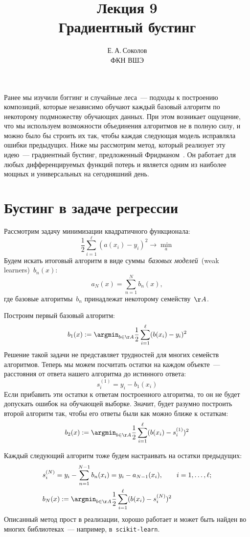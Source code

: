 \documentclass[12pt,fleqn]{article}
\begin{document}
\title{Лекция 9\\Градиентный бустинг}
\author{Е.\,А.\,Соколов\\ФКН ВШЭ}
\maketitle

Ранее мы изучили бэггинг и случайные леса~--- подходы к построению композиций, которые
независимо обучают каждый базовый алгоритм по некоторому подмножеству обучающих данных.
При этом возникает ощущение, что мы используем возможности объединения алгоритмов
не в полную силу, и можно было бы строить их так, чтобы каждая следующая модель
исправляла ошибки предыдущих.
Ниже мы рассмотрим метод, который реализует эту идею~--- градиентный бустинг,
предложенный Фридманом~\cite{friedman01gbm}.
Он работает для любых дифференцируемых функций потерь и является одним из наиболее
мощных и универсальных на сегодняшний день.

\section{Бустинг в задаче регрессии}\label{section:regBoost}
Рассмотрим задачу минимизации квадратичного функционала:
\[
    \frac12
    \sum_{i = 1}^{\ell}
        (a(x_i) - y_i)^2
    \to
    \min_{a}
\]
Будем искать итоговый алгоритм в виде суммы~\emph{базовых моделей}~(weak learners)~$b_n(x)$:
\[
    a_N(x)
    =
    \sum_{n = 1}^{N}
        b_n(x),
\]
где базовые алгоритмы~$b_n$ принадлежат некоторому семейству~$\AA$.

Построим первый базовый алгоритм:
\[
    b_1(x)
    :=
    \argmin_{b \in \AA}
        \frac12
        \sum_{i = 1}^{\ell}
            (b(x_i) - y_i)^2
\]
Решение такой задачи не представляет трудностей для многих семейств алгоритмов.
Теперь мы можем посчитать остатки на каждом объекте~--- расстояния от ответа
нашего алгоритма до истинного ответа:
\[
    s_i^{(1)} = y_i - b_1(x_i)
\]
Если прибавить эти остатки к ответам построенного алгоритма, то он не будет допускать
ошибок на обучающей выборке.
Значит, будет разумно построить второй алгоритм так, чтобы его ответы
были как можно ближе к остаткам:
\[
    b_2(x)
    :=
    \argmin_{b \in \AA}
        \frac12
        \sum_{i = 1}^{\ell}
            (b(x_i) - s_i^{(1)})^2
\]

Каждый следующий алгоритм тоже будем настраивать на остатки предыдущих:
\begin{align*}
    &s_i^{(N)}
    =
    y_i - \sum_{n = 1}^{N - 1} b_n(x_i)
    =
    y_i
    -
    a_{N - 1}(x_i),
    \qquad
    i = 1, \dots, \ell;\\
    &b_N(x)
    :=
    \argmin_{b \in \AA}
        \frac12
        \sum_{i = 1}^{\ell}
            (b(x_i) - s_i^{(N)})^2
\end{align*}
Описанный метод прост в реализации,
хорошо работает и может быть найден во многих библиотеках~---
например, в~\texttt{scikit-learn}.
\end{document}
